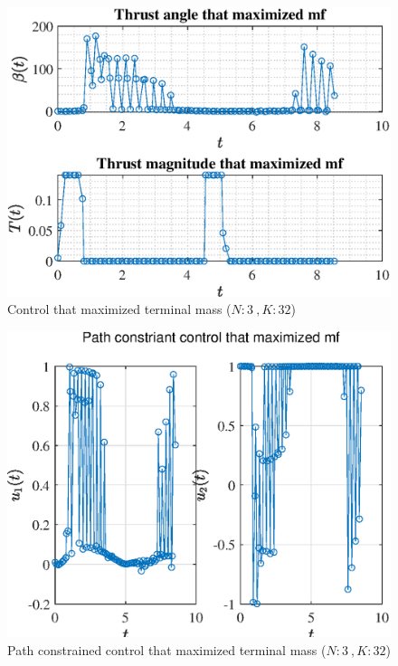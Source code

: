 \documentclass[]{article}
\begin{document}
	\begin{figure}
		\centering
		\includegraphics[scale=0.75]{control_N3_K32_C3_mf.eps}
		\caption{Control that maximized terminal mass (\(N:3\ , K:32\))}
		\label{fig:control_N3_K32_C3_mf}
	\end{figure}
	\begin{figure}
		\centering
		\includegraphics[scale=0.75]{path_N3_K32_C3_mf.eps}
		\caption{Path constrained control that maximized terminal mass (\(N:3\ , K:32\))}
		\label{fig:path_N3_K32_C3_mf}
	\end{figure}
\end{document}
